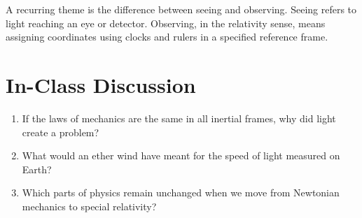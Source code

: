 \documentclass[12pt]{article}
\newif\ifshowboardanswers
\newif\ifshowboardquestion
\newcommand{\boardanswer}[1]{\ifshowboardanswers\\[0.35em]\textcolor{blue}{\textbf{Answer.} #1}\fi}
\begin{document}
A recurring theme is the difference between seeing and observing. Seeing refers to light reaching an eye or detector. Observing, in the relativity sense, means assigning coordinates using clocks and rulers in a specified reference frame.

\section*{In-Class Discussion}
\begin{enumerate}
    \item If the laws of mechanics are the same in all inertial frames, why did light create a problem?
    \item What would an ether wind have meant for the speed of light measured on Earth?
    \item Which parts of physics remain unchanged when we move from Newtonian mechanics to special relativity?
\end{enumerate}

\ifshowboardquestion
\section*{Board Question}
\begin{tcolorbox}[colback=blue!5!white]
The Michelson--Morley experiment found no ether wind.
\begin{enumerate}
    \item Explain why this was surprising if Galilean velocity addition applies to light.
    \boardanswer{If light behaved like ordinary waves in a medium, Earth's motion through the ether should change the measured speed of light in different directions. The null result contradicted this Galilean expectation.}
    \item State the two postulates of special relativity.
    \boardanswer{The laws of physics are the same in all inertial frames, and all inertial observers measure the same speed of light in vacuum.}
    \item Draw a simple spacetime diagram showing two light pulses emitted from the same event in opposite directions.
    \boardanswer{The pulses are two lightlike worldlines starting at the same event, with slopes $+1$ and $-1$ in units where $c=1$.}
    \item Which part of the Newtonian picture has to be changed: the laws of mechanics, the idea of inertial frames, or the absoluteness of space and time?
    \boardanswer{The absoluteness of space and time must be changed. Inertial frames remain central, and the laws of physics are still required to be frame independent.}
\end{enumerate}
\end{tcolorbox}
\fi
\end{document}
